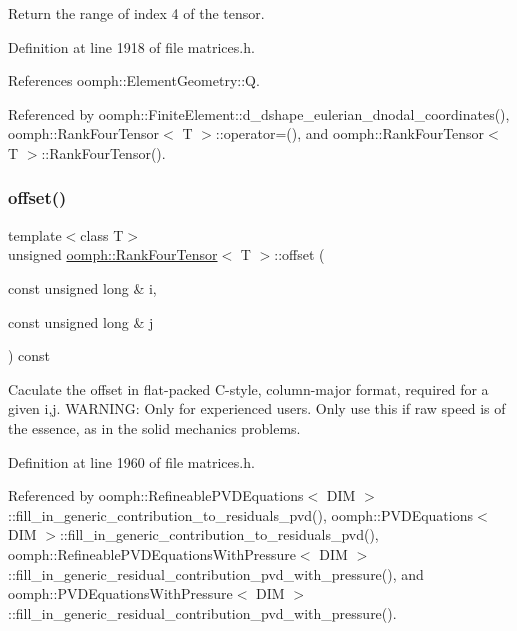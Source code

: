 Return the range of index 4 of the tensor. 



Definition at line 1918 of file matrices.\+h.



References oomph\+::\+Element\+Geometry\+::Q.



Referenced by oomph\+::\+Finite\+Element\+::d\+\_\+dshape\+\_\+eulerian\+\_\+dnodal\+\_\+coordinates(), oomph\+::\+Rank\+Four\+Tensor$<$ T $>$\+::operator=(), and oomph\+::\+Rank\+Four\+Tensor$<$ T $>$\+::\+Rank\+Four\+Tensor().

\mbox{\label{classoomph_1_1RankFourTensor_a4218f2bff16fe393ed704207e39c9b55}} 
\subsubsection{\texorpdfstring{offset()}{offset()}}
{\footnotesize\ttfamily template$<$class T$>$ \\
unsigned \hyperlink{classoomph_1_1RankFourTensor}{oomph\+::\+Rank\+Four\+Tensor}$<$ T $>$\+::offset (\begin{DoxyParamCaption}\item[{const unsigned long \&}]{i,  }\item[{const unsigned long \&}]{j }\end{DoxyParamCaption}) const\hspace{0.3cm}{\ttfamily [inline]}}



Caculate the offset in flat-\/packed C-\/style, column-\/major format, required for a given i,j. W\+A\+R\+N\+I\+NG\+: Only for experienced users. Only use this if raw speed is of the essence, as in the solid mechanics problems. 



Definition at line 1960 of file matrices.\+h.



Referenced by oomph\+::\+Refineable\+P\+V\+D\+Equations$<$ D\+I\+M $>$\+::fill\+\_\+in\+\_\+generic\+\_\+contribution\+\_\+to\+\_\+residuals\+\_\+pvd(), oomph\+::\+P\+V\+D\+Equations$<$ D\+I\+M $>$\+::fill\+\_\+in\+\_\+generic\+\_\+contribution\+\_\+to\+\_\+residuals\+\_\+pvd(), oomph\+::\+Refineable\+P\+V\+D\+Equations\+With\+Pressure$<$ D\+I\+M $>$\+::fill\+\_\+in\+\_\+generic\+\_\+residual\+\_\+contribution\+\_\+pvd\+\_\+with\+\_\+pressure(), and oomph\+::\+P\+V\+D\+Equations\+With\+Pressure$<$ D\+I\+M $>$\+::fill\+\_\+in\+\_\+generic\+\_\+residual\+\_\+contribution\+\_\+pvd\+\_\+with\+\_\+pressure().

